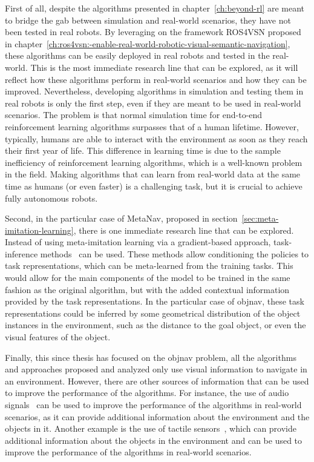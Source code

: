 First of all, despite the algorithms presented in chapter~\ref{ch:beyond-rl} are meant to bridge the gab between simulation and real-world scenarios, they have not been tested in real robots.
By leveraging on the framework ROS4VSN proposed in chapter~\ref{ch:ros4vsn:-enable-real-world-robotic-visual-semantic-navigation}, these algorithms can be easily deployed in real robots and tested in the real-world.
This is the most immediate research line that can be explored, as it will reflect how these algorithms perform in real-world scenarios and how they can be improved.
Nevertheless, developing algorithms in simulation and testing them in real robots is only the first step, even if they are meant to be used in real-world scenarios.
The problem is that normal simulation time for end-to-end reinforcement learning algorithms surpasses that of a human lifetime.
However, typically, humans are able to interact with the environment as soon as they reach their first year of life.
This difference in learning time is due to the sample inefficiency of reinforcement learning algorithms, which is a well-known problem in the field.
Making algorithms that can learn from real-world data at the same time as humans (or even faster) is a challenging task, but it is crucial to achieve fully autonomous robots.

Second, in the particular case of MetaNav, proposed in section~\ref{sec:meta-imitation-learning}, there is one immediate research line that can be explored.
Instead of using meta-imitation learning via a gradient-based approach, task-inference methods~\cite{Beck_2025, rakelly2019} can be used.
These methods allow conditioning the policies to task representations, which can be meta-learned from the training tasks.
This would allow for the main components of the model to be trained in the same fashion as the original algorithm, but with the added contextual information provided by the task representations.
In the particular case of \acrshort{objnav}, these task representations could be inferred by some geometrical distribution of the object instances in the environment, such as the distance to the goal object, or even the visual features of the object.

Finally, this since thesis has focused on the \acrshort{objnav} problem, all the algorithms and approaches proposed and analyzed only use visual information to navigate in an environment.
However, there are other sources of information that can be used to improve the performance of the algorithms.
For instance, the use of audio signals~\cite{Kondoh2023MultigoalAN} can be used to improve the performance of the algorithms in real-world scenarios, as it can provide additional information about the environment and the objects in it.
Another example is the use of tactile sensors~\cite{Ota2023TactileEO}, which can provide additional information about the objects in the environment and can be used to improve the performance of the algorithms in real-world scenarios.

